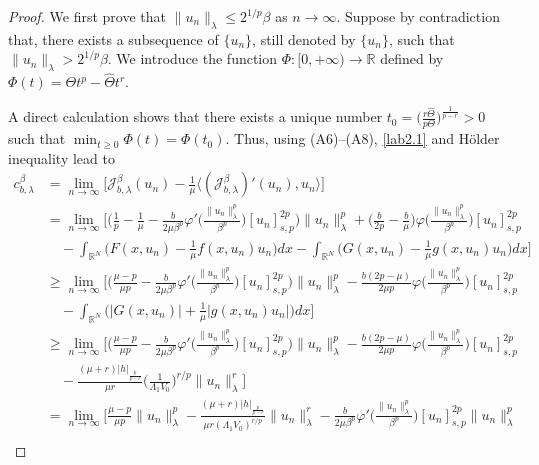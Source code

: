 \documentclass[10pt,a4paper]{amsart}
\numberwithin{equation}{section}
\begin{document}
\begin{proof}
We first prove that $\|u_n\|_\lambda\leq 2^{1/p}\beta$ as $n\to \infty$.
Suppose by contradiction that, there exists a subsequence of $\{u_n\}$, still 
denoted by $\{u_n\}$, such that $\|u_n\|_\lambda> 2^{1/p}\beta$.
We introduce the function $\Phi: [0,+\infty)\to  \mathbb{R}$ defined by
$\Phi(t)=\Theta t^p-\widehat{\Theta}t^r$.

A direct calculation shows that there exists a unique number
$t_0=\big(\frac{r\widehat{\Theta}}{p\Theta}\big)^\frac{1}{p-r}>0$
such that $\min_{t\geq0}\Phi(t)=\Phi(t_0)$. 
Thus, using (A6)--(A8), \eqref{lab2.1} and H\"older inequality lead to
\begin{align*}
 c_{b,\lambda}^\beta
&= \lim_{n\to \infty} \Big[\mathcal{J}^\beta_{b,\lambda}(u_n)-\frac{1}{\mu} 
 \langle (\mathcal{J}^\beta_{b,\lambda})'(u_n), u_n\rangle \Big] \\
&= \lim_{n\to \infty} \Big[\Big(\frac{1}{p}-\frac{1}{\mu}-\frac{b}{2\mu\beta^p}
 \varphi'\Big( \frac{\|u_n\|^p_\lambda}{\beta^p}\Big) [u_n]^{2p}_{s,p}\Big)
 \|u_n\|^p_\lambda+\Big(\frac{b}{2p}-\frac{b}{\mu}\Big)\varphi
 \Big( \frac{\|u_n\|^p_\lambda}{\beta^p}\Big) [u_n]^{2p}_{s,p}  \\
&\quad -\int_{\mathbb{R}^N}\Big(F(x,u_n)-\frac{1}{\mu}f(x,u_n)u_n\Big)dx
 -\int_{\mathbb{R}^N}\Big(G(x,u_n)-\frac{1}{\mu}g(x,u_n)u_n\Big)                        dx \Big]   \\
&\geq \lim_{n\to \infty} \Big[\Big(\frac{\mu-p}{\mu p}
 -\frac{b}{2\mu\beta^p} \varphi'\Big( \frac{\|u_n\|^p_\lambda}{\beta^p}\Big)
  [u_n]^{2p}_{s,p}\Big)\|u_n\|^p_\lambda-\frac{b(2p-\mu)}{2\mu p}
  \varphi\Big( \frac{\|u_n\|^p_\lambda}{\beta^p}\Big) [u_n]^{2p}_{s,p}  \\
&\quad -\int_{\mathbb{R}^N} \Big(|G(x,u_n)|+\frac{1}{\mu}|g(x,u_n)u_n|\Big)dx \Big]  \\
&\geq \lim_{n\to \infty} \Big[ \Big(\frac{\mu-p}{\mu p} -\frac{b}{2\mu\beta^p} 
 \varphi'\Big( \frac{\|u_n\|^p_\lambda}{\beta^p}\Big) [u_n]^{2p}_{s,p}\Big)
 \|u_n\|^p_\lambda-\frac{b(2p-\mu)}{2\mu p}\varphi
 \Big( \frac{\|u_n\|^p_\lambda}{\beta^p}\Big) [u_n]^{2p}_{s,p}  \\
&\quad -\frac{(\mu+r)|h|_{\frac{p}{p-r}}}{\mu r}\Big(\frac{1}{\Lambda_1V_0}
 \Big)^{r/p}\|u_n\|^r_\lambda  \Big]  \\
&= \lim_{n\to \infty} \Big[\frac{\mu-p}{\mu p}\|u_n\|^p_\lambda
 -\frac{(\mu+r)|h|_{\frac{p}{p-r}}}{\mu r (\Lambda_1 V_0)^{r/p}}
 \|u_n\|^r_\lambda-\frac{b}{2\mu\beta^p}
\varphi'\Big(\frac{\|u_n\|^p_\lambda}{\beta^p}\Big) [u_n]^{2p}_{s,p}\|u_n\|^p_\lambda  \\

\end{align*}
\end{proof}
\end{document}

